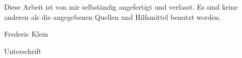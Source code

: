 
%



	
\restoregeometry


\newpage 
\thispagestyle{empty}
\quad 
\newpage

\clearpage
\vspace*{\fill}
\begin{center}
	\begin{minipage}{.8\textwidth}
		\thispagestyle{empty} %
		Diese Arbeit ist von mir selbst\"andig angefertigt und verfasst. Es sind keine anderen als die angegebenen Quellen und Hilfsmittel benutzt worden.\par
		\vspace{1cm}
		Frederic Klein \dotfill \par
		Unterschrift
	\end{minipage}
\end{center}
\vfill %
\clearpage

\newpage 
\thispagestyle{empty}
\quad 
\newpage


